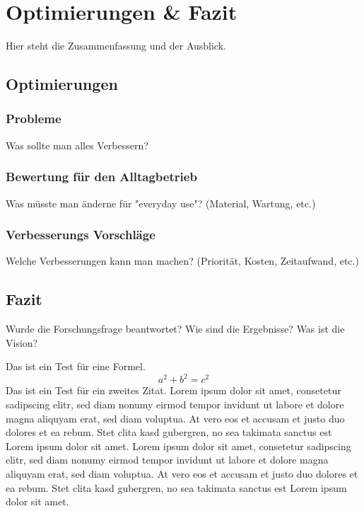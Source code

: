 \section{Optimierungen \& Fazit}\label{sec:Fazit}
Hier steht die Zusammenfassung und der Ausblick.


\subsection*{Optimierungen}\label{sub:Optimierungen}

\subsubsection{Probleme}\label{sec:Probleme}
Was sollte man alles Verbessern?

\subsubsection{Bewertung für den Alltagbetrieb}\label{sec:BewertungAlltagbetrieb}
Was müsste man änderne für "everyday use"? (Material, Wartung, etc.)

\subsubsection{Verbesserungs Vorschläge}\label{sec:Verbesserungsvorschläge}
Welche Verbesserungen kann man machen? (Priorität, Kosten, Zeitaufwand, etc.)


\subsection*{Fazit}\label{sub:Fazit}
Wurde die Forschungsfrage beantwortet? Wie sind die Ergebnisse? Was ist die Vision?












Das ist ein Test für eine Formel.
\begin{equation}
	a^2 + b^2 = c^2
\end{equation}
Das ist ein Test für ein zweites Zitat.
Lorem ipsum dolor sit amet, consetetur sadipscing elitr, sed diam nonumy eirmod tempor invidunt ut labore et dolore magna aliquyam erat, sed diam voluptua. At vero eos et accusam et justo duo dolores et ea rebum. Stet clita kasd gubergren, no sea takimata sanctus est Lorem ipsum dolor sit amet. Lorem ipsum dolor sit amet, consetetur sadipscing elitr, sed diam nonumy eirmod tempor invidunt ut labore et dolore magna aliquyam erat, sed diam voluptua. At vero eos et accusam et justo duo dolores et ea rebum. Stet clita kasd gubergren, no sea takimata sanctus est Lorem ipsum dolor sit amet.

